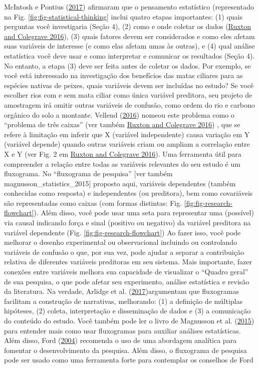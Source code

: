 \documentclass[
]{article}
\begin{document}
McIntosh e Pontius (\protect\hyperlink{ref-mcintosh_science_2017}{2017}) afirmaram que o pensamento estatístico (representado na Fig. \ref{fig:fig-statistical-thinking} inclui quatro etapas importantes: (1) quais perguntas você investigaria (Seção 4), (2) como e onde coletar os dados (\protect\hyperlink{ref-ruxton_experimental_2016}{Ruxton and Colegrave 2016}), (3) quais fatores devem ser considerados e como eles afetam suas variáveis de interesse (e como elas afetam umas às outras), e (4) qual análise estatística você deve usar e como interpretar e comunicar os resultados (Seção 4). No entanto, a etapa (3) deve ser feita antes de coletar os dados. Por exemplo, se você está interessado na investigação dos benefícios das matas ciliares para as espécies nativas de peixes, quais variáveis devem ser incluídas no estudo? Se você escolher rios com e sem mata ciliar como única variável preditora, seu projeto de amostragem irá omitir outras variáveis de confusão, como ordem do rio e carbono orgânico do solo a montante. Vellend (\protect\hyperlink{ref-vellend_theory_2016}{2016}) nomeou este problema como o ``problema de três caixas'' (ver também \protect\hyperlink{ref-ruxton_experimental_2016}{Ruxton and Colegrave 2016}) , que se refere à limitação em inferir que X (variável independente) causa variação em Y (variável depende) quando outras variáveis criam ou ampliam a correlação entre X e Y (ver Fig. 2 em \protect\hyperlink{ref-ruxton_experimental_2016}{Ruxton and Colegrave 2016}). Uma ferramenta útil para compreender a relação entre todas as variáveis relevantes do seu estudo é um fluxograma. No ``fluxograma de pesquisa'' {[}ver também magnusson\_statistics\_2015{]} proposto aqui, variáveis dependentes (também conhecidas como resposta) e independentes (ou preditora), bem como covariáveis são representadas como caixas (com formas distintas: Fig. \ref{fig:fig-research-flowchart}). Além disso, você pode usar uma seta para representar uma (possível) via causal indicando força e sinal (positivo ou negativo) da variável preditora na variável dependente (Fig. \ref{fig:fig-research-flowchart}) Ao fazer isso, você pode melhorar o desenho experimental ou observacional incluindo ou controlando variáveis de confusão o que, por sua vez, pode ajudar a separar a contribuição relativa de diferentes variáveis preditoras em seu sistema. Mais importante, fazer conexões entre variáveis melhora sua capacidade de visualizar o ``Quadro geral'' de sua pesquisa, o que pode afetar seu experimento, análise estatística e revisão da literatura. Na verdade, Arlidge et al. (\protect\hyperlink{ref-arlidge_using_2017}{2017})argumentam que fluxogramas facilitam a construção de narrativas, melhorando: (1) a definição de múltiplas hipóteses, (2) coleta, interpretação e disseminação de dados e (3) a comunicação do conteúdo do estudo. Você também pode ler o livro de Magnusson et al. (\protect\hyperlink{ref-magnusson_statistics_2015}{2015}) para entender mais como usar fluxogramas para auxiliar análises estatísticas. Além disso, Ford (\protect\hyperlink{ref-ford_scientific_2004}{2004}) recomenda o uso de uma abordagem analítica para fomentar o desenvolvimento da pesquisa. Além disso, o fluxograma de pesquisa pode ser usado como uma ferramenta forte para contemplar os conselhos de Ford 
\end{document}
